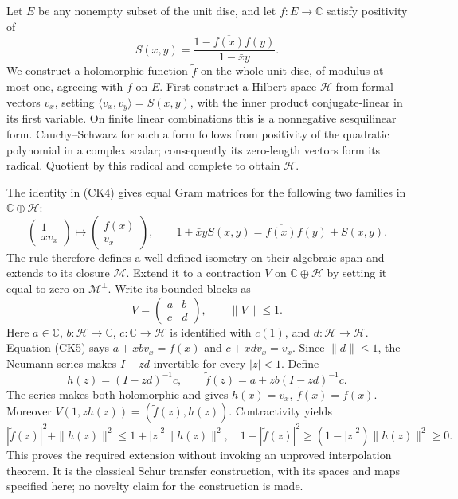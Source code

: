 \documentclass[
  10pt,
  a4paper,
]{article}
\begin{document}
Let \(E\) be any nonempty subset of the unit disc, and let
\(f:E\to\mathbb C\) satisfy positivity of \[
S(x,y)=\frac{1-\overline{f(x)}f(y)}{1-\bar x y}.
\tag{CK4}
\] We construct a holomorphic function \(\widetilde f\) on the whole
unit disc, of modulus at most one, agreeing with \(f\) on \(E\). First
construct a Hilbert space \(\mathcal H\) from formal vectors \(v_x\),
setting \(\langle v_x,v_y\rangle=S(x,y)\), with the inner product
conjugate-linear in its first variable. On finite linear combinations
this is a nonnegative sesquilinear form. Cauchy--Schwarz for such a form
follows from positivity of the quadratic polynomial in a complex scalar;
consequently its zero-length vectors form its radical. Quotient by this
radical and complete to obtain \(\mathcal H\).

The identity in (CK4) gives equal Gram matrices for the following two
families in \(\mathbb C\oplus\mathcal H\): \[
\begin{pmatrix}1\\xv_x\end{pmatrix}
\longmapsto
\begin{pmatrix}f(x)\\v_x\end{pmatrix},
\qquad
1+\bar x yS(x,y)=\overline{f(x)}f(y)+S(x,y).
\tag{CK5}
\] The rule therefore defines a well-defined isometry on their algebraic
span and extends to its closure \(\mathcal M\). Extend it to a
contraction \(V\) on \(\mathbb C\oplus\mathcal H\) by setting it equal
to zero on \(\mathcal M^\perp\). Write its bounded blocks as \[
V=\begin{pmatrix}a&b\\c&d\end{pmatrix},\qquad \|V\|\le1.
\tag{CK6}
\] Here \(a\in\mathbb C\), \(b:\mathcal H\to\mathbb C\),
\(c:\mathbb C\to\mathcal H\) is identified with \(c(1)\), and
\(d:\mathcal H\to\mathcal H\). Equation (CK5) says \(a+xbv_x=f(x)\) and
\(c+xdv_x=v_x\). Since \(\|d\|\le1\), the Neumann series makes \(I-zd\)
invertible for every \(|z|<1\). Define \[
h(z)=(I-zd)^{-1}c,\qquad
\widetilde f(z)=a+zb(I-zd)^{-1}c.
\tag{CK7}
\] The series makes both holomorphic and gives \(h(x)=v_x\),
\(\widetilde f(x)=f(x)\). Moreover
\(V(1,zh(z))=(\widetilde f(z),h(z))\). Contractivity yields \[
|\widetilde f(z)|^2+\|h(z)\|^2
\le1+|z|^2\|h(z)\|^2,
\quad
1-|\widetilde f(z)|^2\ge(1-|z|^2)\|h(z)\|^2\ge0.
\tag{CK8}
\] This proves the required extension without invoking an unproved
interpolation theorem. It is the classical Schur transfer construction,
with its spaces and maps specified here; no novelty claim for the
construction is made.
\end{document}
